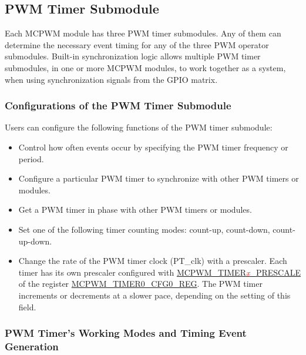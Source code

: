 \documentclass[main\_\_EN.tex]{subfiles}
\begin{document}
\subsection{PWM Timer Submodule}
\label{sec:mcpwm-timer-sub}

Each MCPWM module has three PWM timer submodules. Any of them can determine the necessary event timing for any of the three PWM operator submodules. Built-in synchronization logic allows multiple PWM timer submodules, in one or more MCPWM modules, to work together as a system, when using synchronization signals from the GPIO matrix.

\subsubsection{Configurations of the PWM Timer Submodule}

Users can configure the following functions of the PWM timer submodule:

\begin{itemize}
    \item Control how often events occur by specifying the PWM timer frequency or period.
    \item Configure a particular PWM timer to synchronize with other PWM timers or modules.
    \item Get a PWM timer in phase with other PWM timers or modules.
    \item Set one of the following timer counting modes: count-up, count-down, count-up-down.
    \item Change the rate of the PWM timer clock (PT\_clk) with a prescaler. Each timer has its own prescaler configured with \hyperref[fielddesc:MCPWMTIMER0PRESCALE]{MCPWM\_TIMER\textcolor{red}{\it{x}}\_PRESCALE} of the register \hyperref[regdesc:MCPWMTIMER0CFG0REG]{MCPWM\_TIMER0\_CFG0\_REG}. The PWM timer increments or decrements at a slower pace, depending on the setting of this field.
\end{itemize}

\subsubsection{PWM Timer's Working Modes and Timing Event Generation}
\label{sec:mcpwm-modes-and-event-generation}
\end{document}

